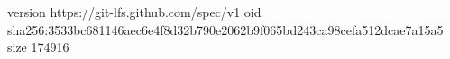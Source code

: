 version https://git-lfs.github.com/spec/v1
oid sha256:3533bc681146aec6e4f8d32b790e2062b9f065bd243ca98cefa512dcae7a15a5
size 174916
